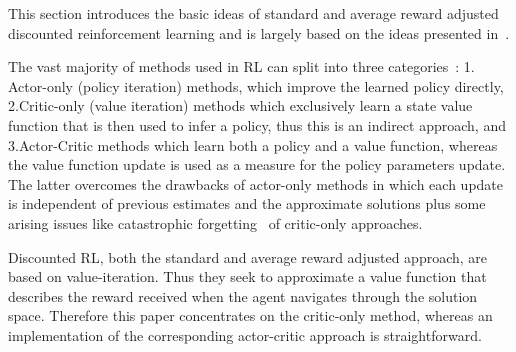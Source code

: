 \documentclass[envcountsame]{llncs}
\begin{document}
This section introduces the basic ideas of standard and average reward adjusted discounted
reinforcement learning and is largely based on the ideas presented
in~\cite{schneckenreither2020average}.

The vast majority of methods used in RL can split into three categories~\cite{konda2000actor}: 1.\@
Actor-only (policy iteration) methods, which improve the learned policy directly, 2.\@ Critic-only
(value iteration) methods which exclusively learn a state value function that is then used to infer
a policy, thus this is an indirect approach, and 3.\@ Actor-Critic methods which learn both a policy
and a value function, whereas the value function update is used as a measure for the policy
parameters update. The latter overcomes the drawbacks of actor-only methods in which each update is
independent of previous estimates and the approximate solutions plus some arising issues like
catastrophic forgetting~\cite{french1999catastrophic} of critic-only approaches.

Discounted RL, both the standard and average reward adjusted approach, are based on value-iteration.
Thus they seek to approximate a value function that describes the reward received when the agent
navigates through the solution space. Therefore this paper concentrates on the critic-only method,
whereas an implementation of the corresponding actor-critic approach is straightforward.
\end{document}
